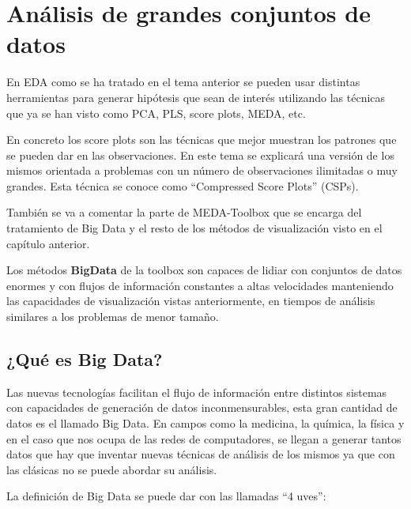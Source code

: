 \chapter{Análisis de grandes conjuntos de datos} \cite{BIGD}
En EDA como se ha tratado en el tema anterior se pueden usar distintas herramientas para generar hipótesis que sean de interés utilizando las técnicas que ya se han visto como PCA, PLS, score plots, MEDA, etc.
\bigskip

En concreto los score plots son las técnicas que mejor muestran los patrones que se pueden dar en las observaciones. En este tema se explicará una versión de los mismos orientada a problemas con un número de observaciones ilimitadas o muy grandes. Esta técnica se conoce como “Compressed Score Plots” (CSPs).
\bigskip

También se va a comentar la parte de MEDA-Toolbox que se encarga del tratamiento de Big Data y el resto de los métodos de visualización visto en el capítulo anterior.
\bigskip

Los métodos \textbf{BigData} de la toolbox son capaces de lidiar con conjuntos de datos enormes y con flujos de información constantes a altas velocidades manteniendo las capacidades de visualización vistas anteriormente, en tiempos de análisis similares a los problemas de menor tamaño.
\bigskip

\section{¿Qué es Big Data?}
Las nuevas tecnologías facilitan el flujo de información entre distintos sistemas con capacidades de generación de datos inconmensurables, esta gran cantidad de datos es el llamado Big Data.  En campos como la medicina, la química, la física y en el caso que nos ocupa de las redes de computadores, se llegan a generar tantos datos que hay que inventar nuevas técnicas de análisis de los mismos ya que con las clásicas no se puede abordar su análisis.
\bigskip

La definición de Big Data se puede dar con las llamadas “4 uves”:

